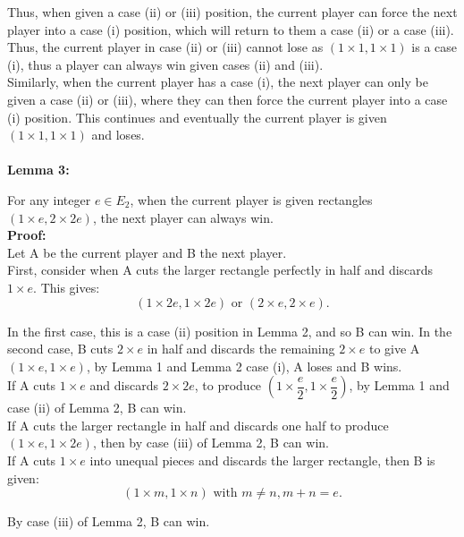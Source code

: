 \documentclass{article}
\begin{document}
Thus, when given a case (ii) or (iii) position, the current player can force the next player into a case (i) position, which will return to them a case (ii) or a case (iii). Thus, the current player in case (ii) or (iii) cannot lose as $(1 \times 1, 1 \times 1)$ is a case (i), thus a player can always win given cases (ii) and (iii). \\

Similarly, when the current player has a case (i), the next player can only be given a case (ii) or (iii), where they can then force the current player into a case (i) position. This continues and eventually the current player is given $(1 \times 1, 1 \times 1)$ and loses. \\ \\


\textbf{Lemma 3:}

\setlength{\parskip}{5pt}
For any integer $e \in E_2$, when the current player is given rectangles $(1\times e, 2\times 2 e)$, the next player can always win. \setlength{\parskip}{0pt} \\

\setlength{\parindent}{0pt}
\textbf{Proof:} \\

Let A be the current player and B the next player. \\
First, consider when A cuts the larger rectangle perfectly in half and discards $1\times e$. This gives:
$$ (1\times 2e, 1\times 2e) \text{ or } (2\times e, 2\times e).$$

In the first case, this is a case (ii) position in Lemma 2, and so B can win. In the second case, B cuts $2\times e$ in half and  discards the remaining $2\times e$ to give A $(1\times e, 1\times e)$, by Lemma 1 and Lemma 2 case (i), A loses and B wins. \\

If A cuts $1\times e$ and discards $2\times 2e$, to produce $\left(1\times \dfrac{e}2, 1\times \dfrac{e}2 \right)$, by Lemma 1 and case (ii) of Lemma 2, B can win. \\

If A cuts the larger rectangle in half and discards one half to produce $(1\times e, 1\times 2e)$, then by case (iii) of Lemma 2, B can win. \\

\newpage
If A cuts $1\times e$ into unequal pieces and discards the larger rectangle, then B is given:
$$(1\times m, 1\times n)\text{ with } m\neq n, m + n = e.$$

By case (iii) of Lemma 2, B can win. \\
\end{document}
